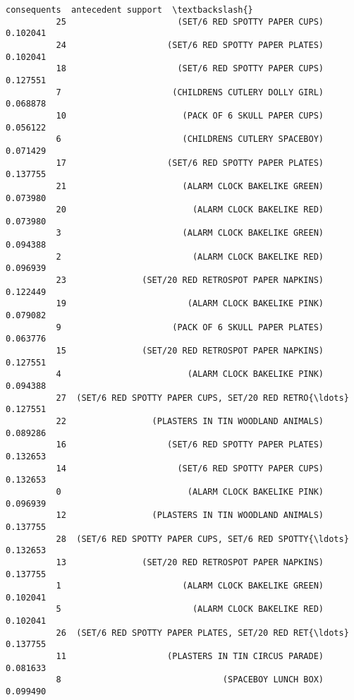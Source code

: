 \documentclass[11pt]{article}
\begin{document}
\begin{Verbatim}[commandchars=\\\{\}]
                                                    consequents  antecedent support  \textbackslash{}
          25                      (SET/6 RED SPOTTY PAPER CUPS)            0.102041   
          24                    (SET/6 RED SPOTTY PAPER PLATES)            0.102041   
          18                      (SET/6 RED SPOTTY PAPER CUPS)            0.127551   
          7                      (CHILDRENS CUTLERY DOLLY GIRL)            0.068878   
          10                       (PACK OF 6 SKULL PAPER CUPS)            0.056122   
          6                        (CHILDRENS CUTLERY SPACEBOY)            0.071429   
          17                    (SET/6 RED SPOTTY PAPER PLATES)            0.137755   
          21                       (ALARM CLOCK BAKELIKE GREEN)            0.073980   
          20                         (ALARM CLOCK BAKELIKE RED)            0.073980   
          3                        (ALARM CLOCK BAKELIKE GREEN)            0.094388   
          2                          (ALARM CLOCK BAKELIKE RED)            0.096939   
          23               (SET/20 RED RETROSPOT PAPER NAPKINS)            0.122449   
          19                        (ALARM CLOCK BAKELIKE PINK)            0.079082   
          9                      (PACK OF 6 SKULL PAPER PLATES)            0.063776   
          15               (SET/20 RED RETROSPOT PAPER NAPKINS)            0.127551   
          4                         (ALARM CLOCK BAKELIKE PINK)            0.094388   
          27  (SET/6 RED SPOTTY PAPER CUPS, SET/20 RED RETRO{\ldots}            0.127551   
          22                 (PLASTERS IN TIN WOODLAND ANIMALS)            0.089286   
          16                    (SET/6 RED SPOTTY PAPER PLATES)            0.132653   
          14                      (SET/6 RED SPOTTY PAPER CUPS)            0.132653   
          0                         (ALARM CLOCK BAKELIKE PINK)            0.096939   
          12                 (PLASTERS IN TIN WOODLAND ANIMALS)            0.137755   
          28  (SET/6 RED SPOTTY PAPER CUPS, SET/6 RED SPOTTY{\ldots}            0.132653   
          13               (SET/20 RED RETROSPOT PAPER NAPKINS)            0.137755   
          1                        (ALARM CLOCK BAKELIKE GREEN)            0.102041   
          5                          (ALARM CLOCK BAKELIKE RED)            0.102041   
          26  (SET/6 RED SPOTTY PAPER PLATES, SET/20 RED RET{\ldots}            0.137755   
          11                    (PLASTERS IN TIN CIRCUS PARADE)            0.081633   
          8                                (SPACEBOY LUNCH BOX)            0.099490   
          

\end{Verbatim}
\end{document}
